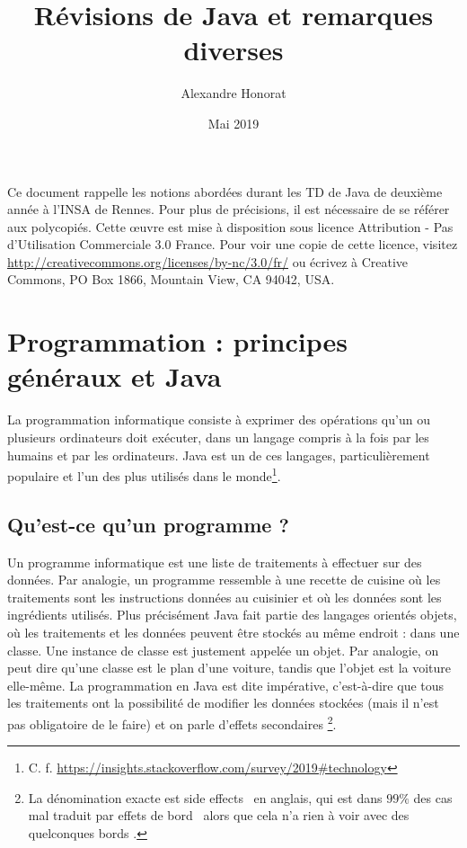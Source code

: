 \documentclass[10pt]{article}
\title{Révisions de Java et remarques diverses}
\author{Alexandre Honorat}
\date{Mai 2019}
\begin{document}
\maketitle

Ce document rappelle les notions abordées durant les TD de Java de deuxième année
à l'INSA de Rennes. Pour plus de précisions, il est nécessaire de se référer aux polycopiés.
Cette œuvre est mise à disposition sous licence
Attribution - Pas d’Utilisation Commerciale 3.0 France.
Pour voir une copie de cette licence, visitez \url{http://creativecommons.org/licenses/by-nc/3.0/fr/}
ou écrivez à Creative Commons, PO Box 1866, Mountain View, CA 94042, USA.

\section{Programmation : principes généraux et Java}


La programmation informatique consiste à exprimer des opérations
qu'un ou plusieurs ordinateurs doit exécuter, dans un langage compris
à la fois par les humains et par les ordinateurs. Java est un de ces langages,
particulièrement populaire et l'un des plus utilisés dans le monde\footnote{C. f. \url{https://insights.stackoverflow.com/survey/2019\#technology}}.


\subsection{Qu'est-ce qu'un programme ?}

Un programme informatique est une liste de traitements à effectuer sur des données. Par analogie, un programme
ressemble à une recette de cuisine où les traitements sont les instructions données au cuisinier
et où les données sont les ingrédients utilisés. Plus précisément Java fait partie des langages
orientés objets, où les traitements et les données peuvent être stockés au même endroit : dans une
classe. Une instance de classe est justement appelée un objet. Par analogie, on peut dire qu'une classe
est le plan d'une voiture, tandis que l'objet est la voiture elle-même.
La programmation en Java est dite impérative, c'est-à-dire que tous les traitements
ont la possibilité de modifier les données stockées (mais il n'est pas obligatoire de le faire) et on parle
d'effets secondaires \footnote{La dénomination exacte est \og side effects \fg~en anglais, qui est dans $99\%$
des cas mal traduit par \og effets de bord \fg~alors que cela n'a rien à voir avec des quelconques \og bords \fg.}.
\end{document}
